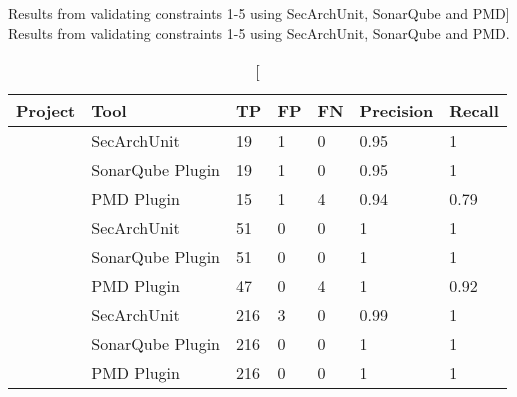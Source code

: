 \begin{table}[ht]
\captionsetup{format=hang,justification=raggedright}
\caption
    [Results from validating constraints 1-5 using SecArchUnit, SonarQube and PMD]
    {Results from validating constraints 1-5 using SecArchUnit, SonarQube and PMD.}
\begin{center}
\begin{tabular}{lxggggg}
\textbf{Project} & \textbf{Tool} & \textbf{TP} & \textbf{FP} & \textbf{FN} & \textbf{Precision} & \textbf{Recall} \\
\hline
{}
        & SecArchUnit & 19 & 1 & 0 & 0.95 & 1 \\
        & SonarQube Plugin & 19 & 1 & 0 & 0.95 & 1 \\
        & PMD Plugin & 15 & 1 & 4 & 0.94 & 0.79 \\
\hline
{}
        & SecArchUnit & 51 & 0 & 0 & 1 & 1 \\
        & SonarQube Plugin & 51 & 0 & 0 & 1 & 1 \\
        & PMD Plugin & 47 & 0 & 4 & 1 & 0.92 \\
\hline
{}
        & SecArchUnit & 216 & 3 & 0 & 0.99 & 1 \\
        & SonarQube Plugin & 216 & 0 & 0 & 1 & 1 \\
        & PMD Plugin & 216 & 0 & 0 & 1 & 1 \\
\hline
\end{tabular}
\end{center}
\label{tab:results_comparison}
\end{table}